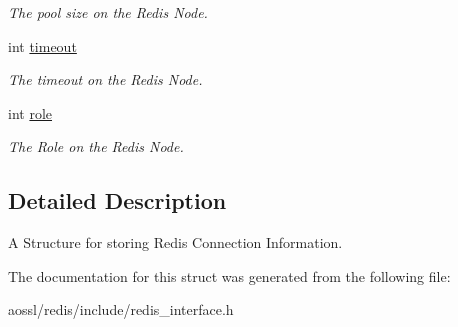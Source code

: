 \begin{DoxyCompactItemize}
\begin{DoxyCompactList}\small\item\em The pool size on the Redis Node. \end{DoxyCompactList}\item 
int \hyperlink{structRedisConnChain_aa8503e6bf1350950dda24ad76cd48e24}{timeout}\hypertarget{structRedisConnChain_aa8503e6bf1350950dda24ad76cd48e24}{}\label{structRedisConnChain_aa8503e6bf1350950dda24ad76cd48e24}

\begin{DoxyCompactList}\small\item\em The timeout on the Redis Node. \end{DoxyCompactList}\item 
int \hyperlink{structRedisConnChain_a92766bf2d64183f8e56515302215b4be}{role}\hypertarget{structRedisConnChain_a92766bf2d64183f8e56515302215b4be}{}\label{structRedisConnChain_a92766bf2d64183f8e56515302215b4be}

\begin{DoxyCompactList}\small\item\em The Role on the Redis Node. \end{DoxyCompactList}\end{DoxyCompactItemize}


\subsection{Detailed Description}
A Structure for storing Redis Connection Information. 

The documentation for this struct was generated from the following file\+:\begin{DoxyCompactItemize}
\item 
aossl/redis/include/redis\+\_\+interface.\+h\end{DoxyCompactItemize}
